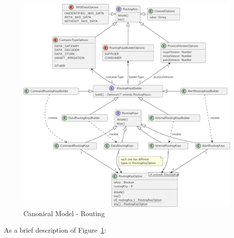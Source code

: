 \begin{figure}[H]
   \centering
  \includegraphics[page=1,width=\columnwidth]{assets/diagrams/design/domain/routing-model.pdf}
  \caption[Canonical Model - Routing]{Canonical Model - Routing}
  \label{fig:design:domain:shared_model:routing:diagram}
\end{figure}

As a brief description of Figure~\ref{fig:design:domain:shared_model:routing:diagram}:

